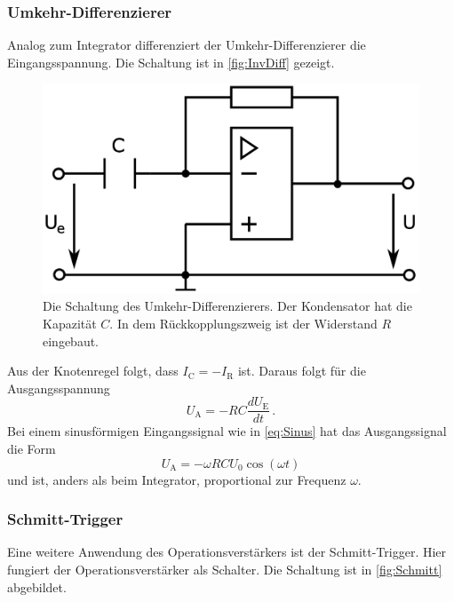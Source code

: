 \subsubsection{Umkehr-Differenzierer}
Analog zum Integrator differenziert der Umkehr-Differenzierer die Eingangsspannung. Die Schaltung ist in \autoref{fig:InvDiff} gezeigt.

\begin{figure}
    \centering
    \includegraphics[width=0.7\linewidth]{./figures/3_InvDiff.png}
    \caption{Die Schaltung des Umkehr-Differenzierers. Der Kondensator hat die Kapazität $C$. In dem Rückkopplungszweig ist der Widerstand $R$ eingebaut. \cite{V51}}
    \label{fig:InvDiff}
\end{figure}
\FloatBarrier

Aus der Knotenregel folgt, dass $I_\text{C} = - I_\text{R}$ ist. Daraus folgt für die Ausgangsspannung
\begin{equation*}
    U_\text{A} = - R C \frac{d U_\text{E}}{dt} \, .
    \label{eq:Differenzierer}
\end{equation*}
Bei einem sinusförmigen Eingangssignal wie in \autoref{eq:Sinus} hat das Ausgangssignal die Form 
\begin{equation}
    U_\text{A} = - \omega R C U_0 \cos(\omega t)
    \label{eq:Diff_Kosinus}
\end{equation}
und ist, anders als beim Integrator, proportional zur Frequenz $\omega$.

\subsubsection{Schmitt-Trigger}
Eine weitere Anwendung des Operationsverstärkers ist der Schmitt-Trigger. Hier fungiert der Operationsverstärker als Schalter. Die Schaltung ist in \autoref{fig:Schmitt} abgebildet.

